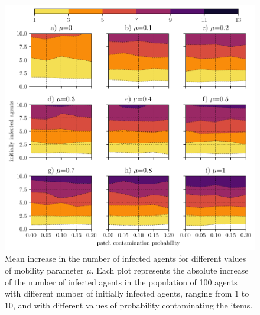 \documentclass[11pt,a4paper]{article}
\begin{document}
\begin{figure}[ht!]
\includegraphics{plots/sick_increase_large_s_pop100.pdf}
\caption{Mean increase in the number of infected agents for different values of mobility parameter $\mu$. Each plot represents the absolute increase of the number of infected agents in the population of 100 agents with different number of initially infected agents, ranging from $1$ to $10$,  and with different values of probability contaminating the items.}
\label{fig:sick_increase_large_s_pop100}
\end{figure}
\end{document}
